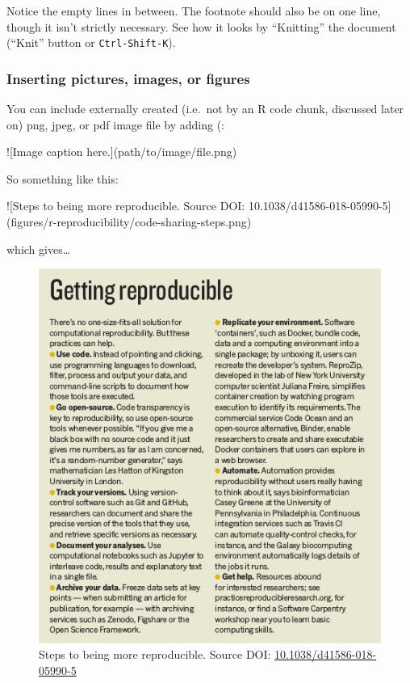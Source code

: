 \documentclass[]{Nemilov}
\newenvironment{Shaded}{\begin{snugshade}}{\end{snugshade}}
\newcommand{\AlertTok}[1]{\textcolor[rgb]{0.94,0.16,0.16}{#1}}
\begin{document}
Notice the empty lines in between. The footnote should also be on one line, though
it isn't strictly necessary. See how it looks by ``Knitting'' the document (``Knit''
button or \texttt{Ctrl-Shift-K}).

\hypertarget{inserting-pictures-images-or-figures}{%
\subsubsection{Inserting pictures, images, or figures}\label{inserting-pictures-images-or-figures}}

You can include externally created (i.e.~not by an R code chunk, discussed later
on) png, jpeg, or pdf image file by adding (:

\begin{Shaded}
\begin{Highlighting}[]
\AlertTok{![Image caption here.](path/to/image/file.png)}
\end{Highlighting}
\end{Shaded}

So something like this:

\begin{Shaded}
\begin{Highlighting}[]
\AlertTok{![Steps to being more reproducible. Source DOI: 10.1038/d41586-018-05990-5](figures/r-reproducibility/code-sharing-steps.png)}
\end{Highlighting}
\end{Shaded}

which gives\ldots{}

\begin{figure}
\centering
\includegraphics{figures/r-reproducibility/code-sharing-steps.png}
\caption{Steps to being more reproducible. Source DOI: \href{https://doi.org/10.1038/d41586-018-05990-5}{10.1038/d41586-018-05990-5}}
\end{figure}
\end{document}
